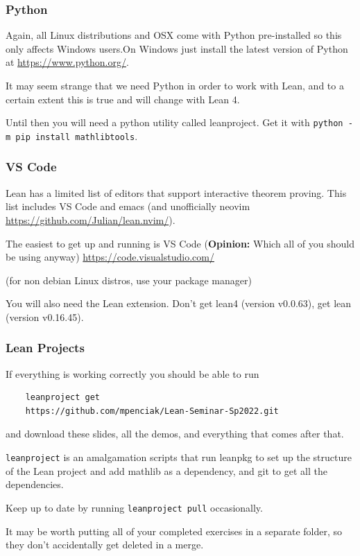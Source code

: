 \documentclass{beamer}
\begin{document}
\begin{frame}[fragile]
    \frametitle{Python}

    Again, all Linux distributions and OSX come with Python pre-installed so this only affects Windows users.On Windows just install the latest version of Python at \url{https://www.python.org/}.
    \vspace{10pt}

    It may seem strange that we need Python in order to work with Lean, and to a certain extent this is true and will change with Lean 4.
    \vspace{10pt}
    
    Until then you will need a python utility called leanproject. Get it with \verb!python -m pip install mathlibtools!. 


\end{frame}

\begin{frame}
    \frametitle{VS Code}

    Lean has a limited list of editors that support interactive theorem proving. This list includes VS Code and emacs (and unofficially neovim \url{https://github.com/Julian/lean.nvim/}).
    \vspace{10pt}
    
    The easiest to get up and running is VS Code ({\bf Opinion:} Which all of you should be using anyway) \url{https://code.visualstudio.com/}

    (for non debian Linux distros, use your package manager)
    \vspace{10pt} 

    You will also need the Lean extension. Don't get lean4 (version v0.0.63), get lean (version v0.16.45). 

\end{frame}

\begin{frame}[fragile]
    \frametitle{Lean Projects}

    If everything is working correctly you should be able to run 
    \begin{verbatim}
    leanproject get
    https://github.com/mpenciak/Lean-Seminar-Sp2022.git
    \end{verbatim}
    and download these slides, all the demos, and everything that comes after that.
    \vspace{10pt}

    \verb!leanproject! is an amalgamation scripts that run leanpkg to set up the structure of the Lean project and add mathlib as a dependency, and git to get all the dependencies. 
    \vspace{10pt}

    Keep up to date by running \verb!leanproject pull! occasionally.
    \vspace{10pt}
    \pause

    It may be worth putting all of your completed exercises in a separate folder, so they don't accidentally get deleted in a merge. 
\end{frame}
\end{document}
